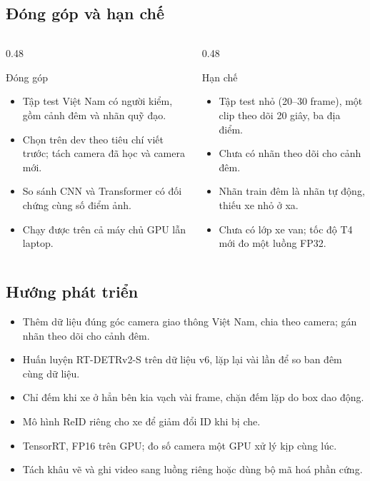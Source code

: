 \documentclass[aspectratio=\mlwAspectRatio, \mlwBaseSize, t]{beamer}
\begin{document}
\subsection{Đóng góp và hạn chế}
\begin{frame}{\stitle}
  \begin{columns}[T]
    \begin{column}{0.48\textwidth}
      \begin{block}{Đóng góp}
        \begin{itemize}
          \item Tập test Việt Nam có người kiểm, gồm cảnh đêm và nhãn quỹ đạo.
          \item Chọn trên dev theo tiêu chí viết trước; tách camera đã học và camera mới.
          \item So sánh CNN và Transformer có đối chứng cùng số điểm ảnh.
          \item Chạy được trên cả máy chủ GPU lẫn laptop.
        \end{itemize}
      \end{block}
    \end{column}
    \begin{column}{0.48\textwidth}
      \begin{block}{Hạn chế}
        \begin{itemize}
          \item Tập test nhỏ (20--30 frame), một clip theo dõi 20 giây, ba địa điểm.
          \item Chưa có nhãn theo dõi cho cảnh đêm.
          \item Nhãn train đêm là nhãn tự động, thiếu xe nhỏ ở xa.
          \item Chưa có lớp xe van; tốc độ T4 mới đo một luồng FP32.
        \end{itemize}
      \end{block}
    \end{column}
  \end{columns}
\end{frame}

\subsection{Hướng phát triển}
\begin{frame}{\stitle}
  \begin{itemize}
    \item Thêm dữ liệu đúng góc camera giao thông Việt Nam, chia theo camera; gán nhãn theo dõi cho cảnh đêm.
    \item Huấn luyện RT-DETRv2-S trên dữ liệu v6, lặp lại vài lần để so ban đêm cùng dữ liệu.
    \item Chỉ đếm khi xe ở hẳn bên kia vạch vài frame, chặn đếm lặp do box dao động.
    \item Mô hình ReID riêng cho xe để giảm đổi ID khi bị che.
    \item TensorRT, FP16 trên GPU; đo số camera một GPU xử lý kịp cùng lúc.
    \item Tách khâu vẽ và ghi video sang luồng riêng hoặc dùng bộ mã hoá phần cứng.
  \end{itemize}
\end{frame}

\bibslide
{}
\end{document}
